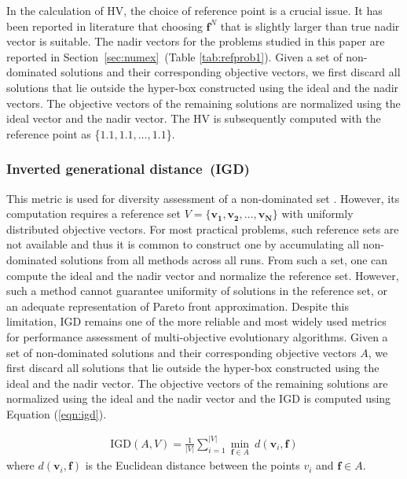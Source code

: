 In the calculation of HV, the choice of reference point is a crucial issue. It has been reported in literature that choosing $\textbf{f}^{N}$ that is slightly larger than true nadir vector is suitable. The nadir vectors for the problems studied in this paper are reported in Section~\ref{sec:numex}~(Table \ref{tab:refprob1}). Given a set of non-dominated solutions and their corresponding objective vectors, we first discard all solutions that lie outside the hyper-box constructed using the ideal and the nadir vectors. The objective vectors of the remaining solutions are normalized using the ideal vector and the nadir vector. The HV is subsequently computed with the reference point as \{$1.1,1.1,\dots,1.1$\}.

\subsubsection{Inverted generational distance~(IGD)} This metric is used for diversity assessment of a non-dominated set \cite{zitzler_performance_2003}. However, its computation requires a reference set $V = \{\mathbf{v_1, v_2,\dots, v_N}\}$ with uniformly distributed objective vectors. For most practical problems, such reference sets are not available and thus it is common to construct one by accumulating all non-dominated solutions from all methods across all runs. From such a set, one can compute the ideal and the nadir vector and normalize the reference set. However, such a method cannot guarantee uniformity of solutions in the reference set, or an adequate representation of Pareto front approximation. Despite this limitation, IGD remains one of the more reliable and most widely used metrics for performance assessment of multi-objective evolutionary algorithms. Given a set of non-dominated solutions and their corresponding objective vectors $A$, we first discard all solutions that lie outside the hyper-box constructed using the ideal and the nadir vector. The objective vectors of the remaining solutions are normalized using the ideal and the nadir vector and the IGD is computed using Equation (\ref{eqn:igd}).

\begin{equation}
\begin{aligned}
\text{IGD}(A,V) = \frac{1}{|V|} \sum_{i=1}^{|V|} \underset{\mathbf{f}\in A}{\min}~d(\mathbf{v}_i,\mathbf{f})
\label{eqn:igd}
\end{aligned}
\end{equation}
where $d(\mathbf{v}_i,\mathbf{f})$ is the Euclidean distance between the points $v_i$ and $\mathbf{f}\in A$.


